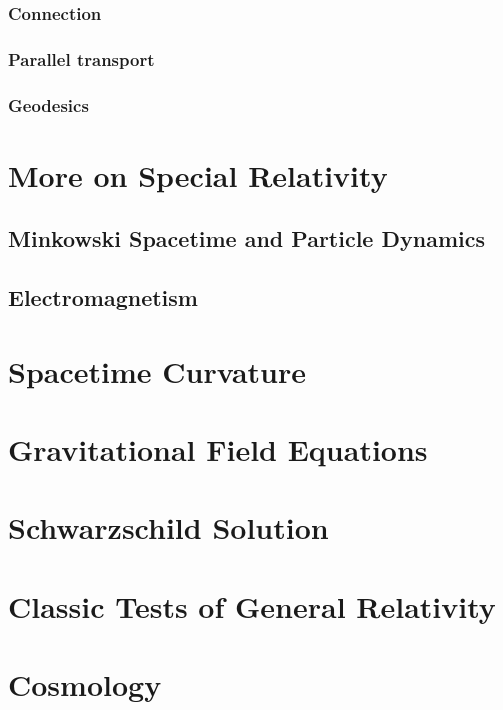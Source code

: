 \documentclass[a4paper]{article}
\theoremstyle{new}
\begin{document}
\subsubsection{Connection}
\subsubsection{Parallel transport}
\subsubsection{Geodesics}
\newpage
\section{More on Special Relativity}
\subsection{Minkowski Spacetime and Particle Dynamics}
\newpage
\subsection{Electromagnetism}
\newpage
\section{Spacetime Curvature}
\newpage
\section{Gravitational Field Equations}
\newpage
\section{Schwarzschild Solution}
\newpage
\section{Classic Tests of General Relativity}
\newpage
\section{Cosmology}
\end{document}
